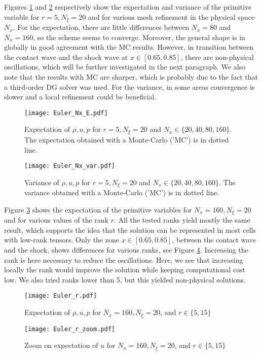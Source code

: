 \documentclass{article}
\begin{document}
Figures \ref{fig:Euler_Nx_E} and \ref{fig:Euler_Nx_var} respectively show the expectation and variance of the primitive variable
for $r=5,N_\xi=20$ and for various mesh refinement in the physical space $N_x$. 
For the expectation, there are little differences between $N_x=80$ and $N_x=160$, so the scheme seems to converge. 
Moreover, the general shape is in globally in good agreement with the MC results. 
However, in transition between the contact wave and the shock wave at $x \in [0.65,0.85]$, there are non-physical oscillations, which will be further investigated in the next paragraph. 
We also note that the results with MC are sharper, which is probably due to the fact that a third-order DG solver was used.
For the variance, in some areas convergence is slower and a local refinement could be beneficial. 
\begin{figure}
    \centering
    \texttt{[image: Euler\_Nx\_E.pdf]}
    \caption{Expectation of $\rho, u,p$ for $r=5, N_\xi=20$ and $N_x\in \{20,40,80,160\}$. 
    The expectation obtained with a Monte-Carlo ('MC') is in dotted line.}
    \label{fig:Euler_Nx_E}
\end{figure}
\begin{figure}
    \centering
    \texttt{[image: Euler\_Nx\_var.pdf]}
    \caption{Variance of $\rho, u, p$ for $r=5, N_\xi=20$ and $N_x\in \{20,40,80,160\}$. 
    The variance obtained with a Monte-Carlo ('MC') is in dotted line.}
    \label{fig:Euler_Nx_var}
\end{figure}


Figure \ref{fig:Euler_r} shows the expectation of the primitive variables for $N_x=160, N_\xi=20$ and for various values of the rank $r$.
All the tested ranks yield mostly the same result, which supports the idea that the solution can be represented in most cells with low-rank tensors. 
Only the zone $x \in [0.65, 0.85]$, between the contact wave and the shock, shows differences for various ranks, see Figure \ref{fig:Euler_r_zoom}. Increasing the rank is here necessary to reduce the oscillations. 
Here, we see that increasing locally the rank would improve the solution while keeping computational cost low. 
We also tried ranks lower than 5, but this yielded non-physical solutions. 
\begin{figure}
    \centering
    \texttt{[image: Euler\_r.pdf]}
    \caption{Expectation of $\rho, u, p$ for $N_x=160, N_\xi=20$, and $r\in \{5,15\}$ }
    \label{fig:Euler_r}
\end{figure}
\begin{figure}
    \centering
    \texttt{[image: Euler\_r\_zoom.pdf]}
    \caption{Zoom on expectation of $u$ for $N_x=160, N_\xi=20$, and $r\in \{5,15\}$}
    \label{fig:Euler_r_zoom}
\end{figure}
\end{document}
